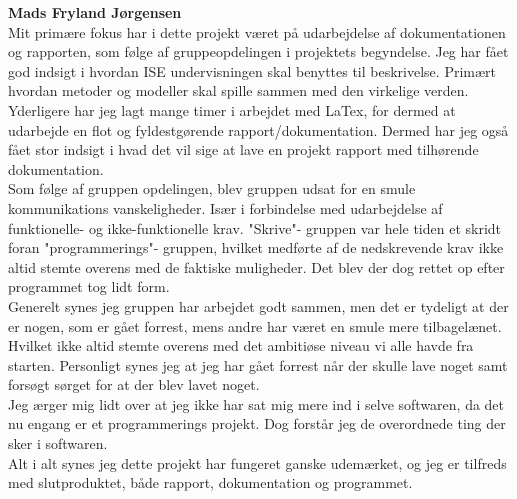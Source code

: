 \textbf{Mads Fryland Jørgensen}\\
Mit primære fokus har i dette projekt været på udarbejdelse af dokumentationen og rapporten, som følge af gruppeopdelingen i projektets begyndelse. Jeg har fået god indsigt i hvordan ISE undervisningen skal benyttes til beskrivelse. Primært hvordan metoder og modeller skal spille sammen med den virkelige verden.\\
Yderligere har jeg lagt mange timer i arbejdet med LaTex, for dermed at udarbejde en flot og fyldestgørende rapport/dokumentation. Dermed har jeg også fået stor indsigt i hvad det vil sige at lave en projekt rapport med tilhørende dokumentation.\\
Som følge af gruppen opdelingen, blev gruppen udsat for en smule kommunikations vanskeligheder. Især i forbindelse med udarbejdelse af funktionelle- og ikke-funktionelle krav. "Skrive"\-- gruppen var hele tiden et skridt foran "programmerings"\-- gruppen, hvilket medførte af de nedskrevende krav ikke altid stemte overens med de faktiske muligheder. Det blev der dog rettet op efter programmet tog lidt form.\\
Generelt synes jeg gruppen har arbejdet godt sammen, men det er tydeligt at der er nogen, som er gået forrest, mens andre har været en smule mere tilbagelænet. Hvilket ikke altid stemte overens med det ambitiøse niveau vi alle havde fra starten. Personligt synes jeg at jeg har gået forrest når der skulle lave noget samt forsøgt sørget for at der blev lavet noget.\\
Jeg ærger mig lidt over at jeg ikke har sat mig mere ind i selve softwaren, da det nu engang er et programmerings projekt. Dog forstår jeg de overordnede ting der sker i softwaren.\\
Alt i alt synes jeg dette projekt har fungeret ganske udemærket, og jeg er tilfreds med slutproduktet, både rapport, dokumentation og programmet.

